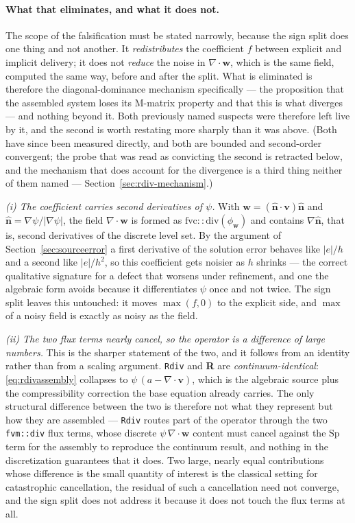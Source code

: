 \documentclass[preprint,3p,11pt]{elsarticle}
\newcommand{\psilev}{\psi}
\newcommand{\nhat}{\hat{\mathbf{n}}}
\newcommand{\gradpsi}{\lvert\nabla\psilev\rvert}
\begin{document}
\paragraph{What that eliminates, and what it does not.} The scope of the
falsification must be stated narrowly, because the sign split does one thing and
not another. It \emph{redistributes} the coefficient $f$ between explicit and
implicit delivery; it does not \emph{reduce} the noise in $\nabla\cdot\mathbf{w}$,
which is the same field, computed the same way, before and after the split. What
is eliminated is therefore the diagonal-dominance mechanism specifically --- the
proposition that the assembled system loses its M-matrix property and that this is
what diverges --- and nothing beyond it. Both previously named suspects were
therefore left live by it, and the second is worth restating more sharply than it
was above. (Both have since been measured directly, and both are bounded and
second-order convergent; the probe that was read as convicting the second is
retracted below, and the mechanism that does account for the divergence is a third
thing neither of them named --- Section~\ref{sec:rdiv-mechanism}.)

\emph{(i) The coefficient carries second derivatives of $\psilev$.} With
$\mathbf{w} = (\nhat\cdot\mathbf{v})\nhat$ and $\nhat = \nabla\psilev/\gradpsi$,
the field $\nabla\cdot\mathbf{w}$ is formed as $\mathrm{fvc::div}(\phi_{\mathbf{w}})$
and contains $\nabla\nhat$, that is, second derivatives of the discrete level set.
By the argument of Section~\ref{sec:sourceerror} a first derivative of the
solution error behaves like $|e|/h$ and a second like $|e|/h^2$, so this
coefficient gets noisier as $h$ shrinks --- the correct qualitative signature for
a defect that worsens under refinement, and one the algebraic form avoids because
it differentiates $\psilev$ once and not twice. The sign split leaves this
untouched: it moves $\max(f,0)$ to the explicit side, and $\max$ of a noisy field
is exactly as noisy as the field.

\emph{(ii) The two flux terms nearly cancel, so the operator is a difference of
large numbers.} This is the sharper statement of the two, and it follows from an
identity rather than from a scaling argument. \texttt{Rdiv} and \textbf{R} are
\emph{continuum-identical}: \eqref{eq:rdivassembly} collapses to
$\psilev\,(a - \nabla\cdot\mathbf{v})$, which is the algebraic source plus the
compressibility correction the base equation already carries. The only structural
difference between the two is therefore not what they represent but how they are
assembled --- \texttt{Rdiv} routes part of the operator through the two
\texttt{fvm::div} flux terms, whose discrete $\psilev\,\nabla\cdot\mathbf{w}$
content must cancel against the $\mathrm{Sp}$ term for the assembly to reproduce
the continuum result, and nothing in the discretization guarantees that it does.
Two large, nearly equal contributions whose difference is the small quantity of
interest is the classical setting for catastrophic cancellation, the residual of
such a cancellation need not converge, and the sign split does not address it
because it does not touch the flux terms at all.
\end{document}
